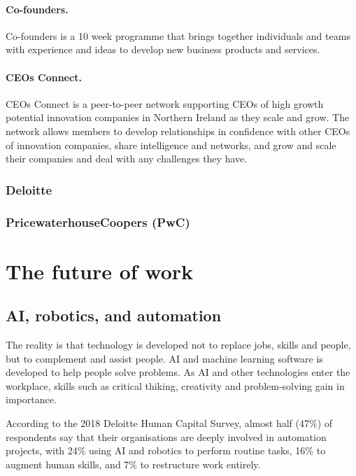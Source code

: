 \paragraph{Co-founders.} Co-founders is a 10 week programme that brings together individuals and teams with experience and ideas to develop new business products and services.

\paragraph{CEOs Connect.} CEOs Connect is a peer-to-peer network supporting CEOs of high growth potential innovation companies in Northern Ireland as they scale and grow. The network allows members to develop relationships in confidence with other CEOs of innovation companies, share intelligence and networks, and grow and scale their companies and deal with any challenges they have.

\subsubsection{Deloitte}

\subsubsection{PricewaterhouseCoopers (PwC)}

\section{The future of work}

\subsection{AI, robotics, and automation}

The reality is that technology is developed not to replace jobs, skills and people, but to complement and assist people. AI and machine learning software is developed to help people solve problems. As AI and other technologies enter the workplace, skills such as critical thiking, creativity and problem-solving gain in importance. 

According to the 2018 Deloitte Human Capital Survey, almost half (47\%) of respondents say that their organisations are deeply involved in automation projects, with 24\% using AI and robotics to perform routine tasks, 16\% to augment human skills, and 7\% to restructure work entirely.


